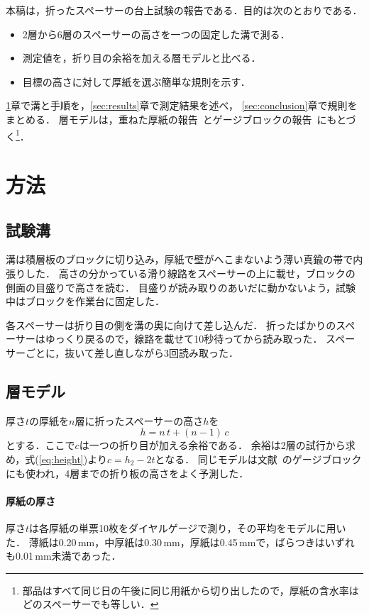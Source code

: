 \documentclass[submit]{ipsj}
\begin{document}
本稿は，折ったスペーサーの台上試験の報告である．目的は次のとおりである．
\begin{itemize}
\item 2層から6層のスペーサーの高さを一つの固定した溝で測る．
\item 測定値を，折り目の余裕を加える層モデルと比べる．
\item 目標の高さに対して厚紙を選ぶ簡単な規則を示す．
\end{itemize}
\ref{sec:method}章で溝と手順を，\ref{sec:results}章で測定結果を述べ，
\ref{sec:conclusion}章で規則をまとめる．
層モデルは，重ねた厚紙の報告~\cite{bench24}とゲージブロックの報告~\cite{scale23}にもとづく\footnote{部品はすべて同じ日の午後に同じ用紙から切り出したので，厚紙の含水率はどのスペーサーでも等しい．}．

\section{方法}\label{sec:method}
\subsection{試験溝}\label{sec:slot}
溝は積層板のブロックに切り込み，厚紙で壁がへこまないよう薄い真鍮の帯で内張りした．
高さの分かっている滑り線路をスペーサーの上に載せ，ブロックの側面の目盛りで高さを読む．
目盛りが読み取りのあいだに動かないよう，試験中はブロックを作業台に固定した．

各スペーサーは折り目の側を溝の奥に向けて差し込んだ．
折ったばかりのスペーサーはゆっくり戻るので，線路を載せて10秒待ってから読み取った．
スペーサーごとに，抜いて差し直しながら3回読み取った．

\subsection{層モデル}\label{sec:model}
厚さ$t$の厚紙を$n$層に折ったスペーサーの高さ$h$を
\begin{equation}
h = n\,t + (n-1)\,c
\label{eq:height}
\end{equation}
とする．ここで$c$は一つの折り目が加える余裕である．
余裕は2層の試行から求め，式(\ref{eq:height})より$c = h_2 - 2t$となる．
同じモデルは文献~\cite{scale23}のゲージブロックにも使われ，4層までの折り板の高さをよく予測した．

\paragraph{厚紙の厚さ}
厚さ$t$は各厚紙の単票10枚をダイヤルゲージで測り，その平均をモデルに用いた．
薄紙は0.20\,mm，中厚紙は0.30\,mm，厚紙は0.45\,mmで，ばらつきはいずれも0.01\,mm未満であった．
\end{document}
